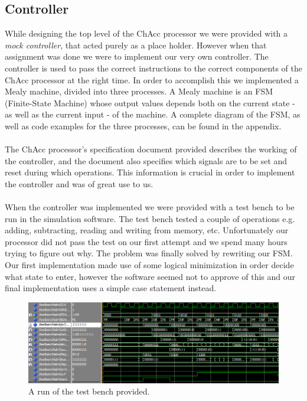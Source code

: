 \documentclass[a4paper,11pt]{article}
\begin{document}
\subsection{Controller}
While designing the top level of the ChAcc processor we were provided with a 
{\it mock controller}, that acted purely as a place holder. However when that 
assignment was done we were to implement our very own controller. The 
controller is used to pass the correct instructions to the correct components 
of the ChAcc processor at the right time. In order to accomplish this we 
implemented a Mealy machine, divided into three processes. A Mealy machine is 
an FSM (Finite-State Machine) whose output values depends both on the current 
state - as well as the current input - of the machine. A complete diagram of 
the FSM, as well as code examples for the three processes, can be found in 
the appendix.\\\\
\noindent
The ChAcc processor's specification document provided describes the working 
of the controller, and the document also specifies which signals are to be set 
and reset during which operations. This information is crucial in order to 
implement the controller and was of great use to us.\\\\
\noindent
When the controller was implemented we were provided with a test bench to be 
run in the simulation software. The test bench tested a couple of operations 
e.g. adding, subtracting, reading and writing from memory, etc. Unfortunately 
our processor did not pass the test on our first attempt and we spend many 
hours trying to figure out why. The problem was finally solved by rewriting 
our FSM. Our first implementation made use of some logical minimization in 
order decide what state to enter, however the software seemed not to approve 
of this and our final implementation uses a simple case statement instead.

\begin{figure}[h]
    \centering
    \includegraphics[width=\linewidth]{testbenchlab4.png}
    \caption{A run of the test bench provided.}
    \label{Memory}
\end{figure}
\noindent
\end{document}
